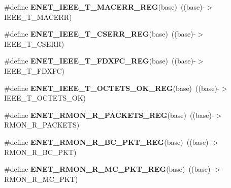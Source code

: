 \begin{DoxyCompactItemize}
\item 
\#define {\bfseries E\+N\+E\+T\+\_\+\+I\+E\+E\+E\+\_\+\+T\+\_\+\+M\+A\+C\+E\+R\+R\+\_\+\+R\+EG}(base)~((base)-\/$>$I\+E\+E\+E\+\_\+\+T\+\_\+\+M\+A\+C\+E\+RR)\hypertarget{group__ENET__Register__Accessor__Macros_gabbc46d7144af318fd350e7735dfdfbb4}{}\label{group__ENET__Register__Accessor__Macros_gabbc46d7144af318fd350e7735dfdfbb4}

\item 
\#define {\bfseries E\+N\+E\+T\+\_\+\+I\+E\+E\+E\+\_\+\+T\+\_\+\+C\+S\+E\+R\+R\+\_\+\+R\+EG}(base)~((base)-\/$>$I\+E\+E\+E\+\_\+\+T\+\_\+\+C\+S\+E\+RR)\hypertarget{group__ENET__Register__Accessor__Macros_gac5d85890dd87f65b1b287a73687267ba}{}\label{group__ENET__Register__Accessor__Macros_gac5d85890dd87f65b1b287a73687267ba}

\item 
\#define {\bfseries E\+N\+E\+T\+\_\+\+I\+E\+E\+E\+\_\+\+T\+\_\+\+F\+D\+X\+F\+C\+\_\+\+R\+EG}(base)~((base)-\/$>$I\+E\+E\+E\+\_\+\+T\+\_\+\+F\+D\+X\+FC)\hypertarget{group__ENET__Register__Accessor__Macros_ga3ea6b0eb9ce457a56df7025225f1ce7b}{}\label{group__ENET__Register__Accessor__Macros_ga3ea6b0eb9ce457a56df7025225f1ce7b}

\item 
\#define {\bfseries E\+N\+E\+T\+\_\+\+I\+E\+E\+E\+\_\+\+T\+\_\+\+O\+C\+T\+E\+T\+S\+\_\+\+O\+K\+\_\+\+R\+EG}(base)~((base)-\/$>$I\+E\+E\+E\+\_\+\+T\+\_\+\+O\+C\+T\+E\+T\+S\+\_\+\+OK)\hypertarget{group__ENET__Register__Accessor__Macros_gac9dce54cc0acf5325e797a79010ed817}{}\label{group__ENET__Register__Accessor__Macros_gac9dce54cc0acf5325e797a79010ed817}

\item 
\#define {\bfseries E\+N\+E\+T\+\_\+\+R\+M\+O\+N\+\_\+\+R\+\_\+\+P\+A\+C\+K\+E\+T\+S\+\_\+\+R\+EG}(base)~((base)-\/$>$R\+M\+O\+N\+\_\+\+R\+\_\+\+P\+A\+C\+K\+E\+TS)\hypertarget{group__ENET__Register__Accessor__Macros_gafb7aa4f09bcc45af7b97bec98b21447a}{}\label{group__ENET__Register__Accessor__Macros_gafb7aa4f09bcc45af7b97bec98b21447a}

\item 
\#define {\bfseries E\+N\+E\+T\+\_\+\+R\+M\+O\+N\+\_\+\+R\+\_\+\+B\+C\+\_\+\+P\+K\+T\+\_\+\+R\+EG}(base)~((base)-\/$>$R\+M\+O\+N\+\_\+\+R\+\_\+\+B\+C\+\_\+\+P\+KT)\hypertarget{group__ENET__Register__Accessor__Macros_ga65aa79116574a6b68541a91c1ef63a48}{}\label{group__ENET__Register__Accessor__Macros_ga65aa79116574a6b68541a91c1ef63a48}

\item 
\#define {\bfseries E\+N\+E\+T\+\_\+\+R\+M\+O\+N\+\_\+\+R\+\_\+\+M\+C\+\_\+\+P\+K\+T\+\_\+\+R\+EG}(base)~((base)-\/$>$R\+M\+O\+N\+\_\+\+R\+\_\+\+M\+C\+\_\+\+P\+KT)\hypertarget{group__ENET__Register__Accessor__Macros_gaeb2c69f6896d3204fda3ca59f230d49d}{}\label{group__ENET__Register__Accessor__Macros_gaeb2c69f6896d3204fda3ca59f230d49d}


\end{DoxyCompactItemize}
